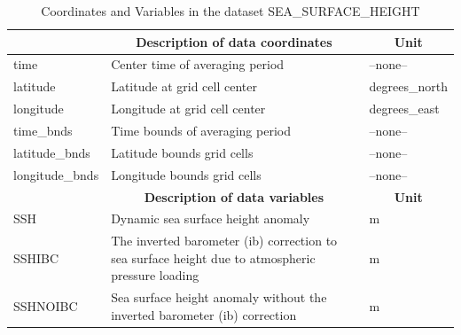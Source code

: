 \begin{longtable}{|m{}|m{}|m{}|}
\caption{Coordinates and Variables in the dataset SEA\_SURFACE\_HEIGHT}
\label{tab:table-<xarray.Dataset> Size: 3MB
Dimensions:         (time: 1, latitude: 360, longitude: 720, nv: 2)
Coordinates:
  * time            (time) datetime64[ns] 8B 2017-12-29T12:00:00
  * latitude        (latitude) float32 1kB -89.75 -89.25 -88.75 ... 89.25 89.75
  * longitude       (longitude) float32 3kB -179.8 -179.2 -178.8 ... 179.2 179.8
    time_bnds       (time, nv) datetime64[ns] 16B ...
    latitude_bnds   (latitude, nv) float32 3kB ...
    longitude_bnds  (longitude, nv) float32 6kB ...
Dimensions without coordinates: nv
Data variables:
    SSH             (time, latitude, longitude) float32 1MB ...
    SSHIBC          (time, latitude, longitude) float32 1MB ...
    SSHNOIBC        (time, latitude, longitude) float32 1MB ...
Attributes: (12/57)
    acknowledgement:              This research was carried out by the Jet Pr...
    author:                       Ian Fenty and Ou Wang
    cdm_data_type:                Grid
    comment:                      Fields provided on a regular lat-lon grid. ...
    Conventions:                  CF-1.8, ACDD-1.3
    coordinates_comment:          Note: the global 'coordinates' attribute de...
    ...                           ...
    time_coverage_duration:       P1D
    time_coverage_end:            2017-12-30T00:00:00
    time_coverage_resolution:     P1D
    time_coverage_start:          2017-12-29T00:00:00
    title:                        ECCO Sea Surface Height - Daily Mean 0.5 De...
    uuid:                         7beb77e0-404a-11eb-8bf7-0cc47a3f891b-fields} \\ 
\hline \endhead \hline \endfoot
\rowcolor{lightgray} \multicolumn{1}{|c|}{\textbf{Coordinates}} & \multicolumn{1}{|c|}{\textbf{Description of data coordinates}} &  \multicolumn{1}{|c|}{\textbf{Unit}}\\ \hline
time &Center time of averaging period &--none--  \\ \hline
latitude &Latitude at grid cell center &degrees\_north  \\ \hline
longitude &Longitude at grid cell center &degrees\_east  \\ \hline
time\_bnds &Time bounds of averaging period &--none--  \\ \hline
latitude\_bnds &Latitude bounds grid cells &--none--  \\ \hline
longitude\_bnds &Longitude bounds grid cells &--none--  \\ \hline
\rowcolor{lightgray} \multicolumn{1}{|c|}{\textbf{Variables}} & \multicolumn{1}{|c|}{\textbf{Description of data variables}} &  \multicolumn{1}{|c|}{\textbf{Unit}}\\ \hline
SSH &Dynamic sea surface height anomaly &m  \\ \hline
SSHIBC &The inverted barometer (ib) correction to sea surface height due to atmospheric pressure loading &m  \\ \hline
SSHNOIBC &Sea surface height anomaly without the inverted barometer (ib) correction &m  \\ \hline
\end{longtable}


